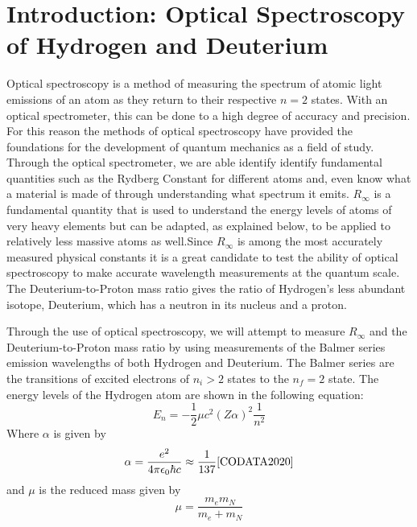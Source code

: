 \documentclass[%
 aps,%
 pra,%
 preprint, %
 amsmath, %
 amsfonts, %
 amssymb, %
]{revtex4-2}
\newcommand{\D}{Deuterium}
\newcommand{\Rin}{$R_\infty$ }
\begin{document}
\section{\label{sec:OpticalSpec} Introduction: Optical Spectroscopy of Hydrogen and \D }
Optical spectroscopy is a method of measuring the spectrum of atomic light emissions of an atom as they return to their respective $n=2$ states. With an optical spectrometer, this can be done to a high degree of accuracy and precision. For this reason the methods of optical spectroscopy have provided the foundations for the development of quantum mechanics as a field of study. Through the optical spectrometer, we are able identify identify fundamental quantities such as the Rydberg Constant for different atoms and, even know what a material is made of through understanding what spectrum it emits. \Rin is a fundamental quantity that is used to understand the energy levels of atoms of very heavy elements but can be adapted, as explained below, to be applied to relatively less massive atoms as well\cite{Eisberg1985}.Since \Rin is among the most accurately measured physical constants it is a great candidate to test the ability of optical spectroscopy to make accurate wavelength measurements at the quantum scale. The \D-to-Proton mass ratio gives the ratio of Hydrogen's less abundant isotope, \D , which has a neutron in its nucleus and a proton. 

Through the use of optical spectroscopy, we will attempt to measure $R_\infty$ and the \D-to-Proton mass ratio by using measurements of the Balmer series emission wavelengths of both Hydrogen and \D. The Balmer series are the transitions of excited electrons of $n_i>2$ states to the $n_f=2$ state\cite{Eisberg1985}. The energy levels of the Hydrogen atom are shown in the following equation\cite{Eisberg1985}:
\begin{equation}
    \label{Eq:EnergyLevels}
    E_n=-\frac{1}{2}\mu c^2 (Z\alpha)^2 \frac{1}{n^2}
\end{equation}
Where $\alpha$ is given by 
\begin{equation}
    \alpha=\frac{e^2}{4\pi \epsilon_0 \hbar c}\approx \frac{1}{137}\cite{CODATA2020}
\end{equation}
and $\mu$ is the reduced mass given by 
\begin{equation}
    \mu=\frac{m_em_N}{m_e+m_N}
\end{equation}
\end{document}
